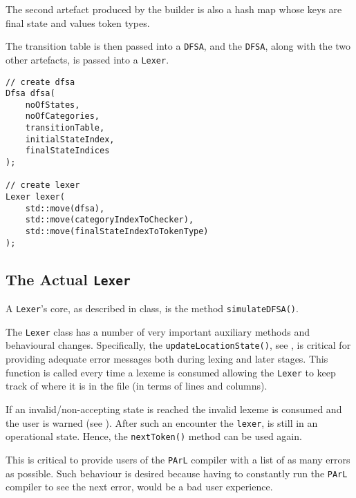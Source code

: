 The second artefact produced by the builder is also a hash map
whose keys are final state and values token types.

The transition table is then passed into a \texttt{DFSA}, and
the \texttt{DFSA}, along with the two other artefacts, is passed
into a \texttt{Lexer}.

\begin{lstlisting}[caption={Construction of a \texttt{Lexer}
(lexer/LexerBuilder.cpp).}]
// create dfsa
Dfsa dfsa(
    noOfStates,
    noOfCategories,
    transitionTable,
    initialStateIndex,
    finalStateIndices
);

// create lexer
Lexer lexer(
    std::move(dfsa),
    std::move(categoryIndexToChecker),
    std::move(finalStateIndexToTokenType)
);
\end{lstlisting}

\pagebreak

\subsection{The Actual \texttt{Lexer}}

A \texttt{Lexer}'s core, as described in class, is the method
\texttt{simulateDFSA()}.

\begin{note}
    The \texttt{Lexer} class has a number of very important
    auxiliary methods and behavioural changes. Specifically, the
    \texttt{updateLocationState()}, see , is
    critical for providing adequate error messages both during
    lexing and later stages. This function is called every time
    a lexeme is consumed allowing the \texttt{Lexer} to keep
    track of where it is in the file (in terms of lines and
    columns).
\end{note}



If an invalid/non-accepting state is reached the invalid lexeme
is consumed and the user is warned (see ).
After such an encounter the \texttt{lexer}, is still in an
operational state. Hence, the \texttt{nextToken()} method can be
used again.

This is critical to provide users of the \texttt{PArL} compiler
with a list of as many errors as possible. Such behaviour is
desired because having to constantly run the \texttt{PArL}
compiler to see the next error, would be a bad user experience.

